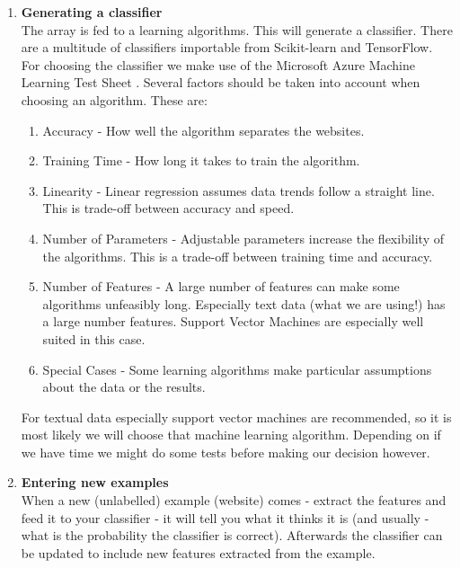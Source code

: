 \begin{enumerate}
    \item \textbf{Generating a classifier} \\
    The array is fed to a learning algorithms. This will generate a classifier. There are a multitude of classifiers importable from Scikit-learn and TensorFlow. For choosing the classifier we make use of the Microsoft Azure Machine Learning Test Sheet \cite{MLCheatSheet}. Several factors should be taken into account when choosing an algorithm. These are:
    \begin{enumerate}
        \item Accuracy - How well the algorithm separates the websites.
        \item Training Time - How long it takes to train the algorithm.
        \item Linearity - Linear regression assumes data trends follow a straight line. This is trade-off between accuracy and speed.
        \item Number of Parameters - Adjustable parameters increase the flexibility of the algorithms. This is a trade-off between training time and accuracy.
        \item Number of Features - A large number of features can make some algorithms unfeasibly long. Especially text data (what we are using!) has a large number features. Support Vector Machines are especially well suited in this case.
        \item Special Cases - Some learning algorithms make particular assumptions about the data or the results.
    \end{enumerate}
    
    For textual data especially support vector machines are recommended, so it is most likely we will choose that machine learning algorithm. Depending on if we have time we might do some tests before making our decision however.
    
    \item \textbf{Entering new examples} \\
    When a new (unlabelled) example (website) comes - extract the features and feed it to your classifier - it will tell you what it thinks it is (and usually - what is the probability the classifier is correct). Afterwards the classifier can be updated to include new features extracted from the example.
\end{enumerate}

